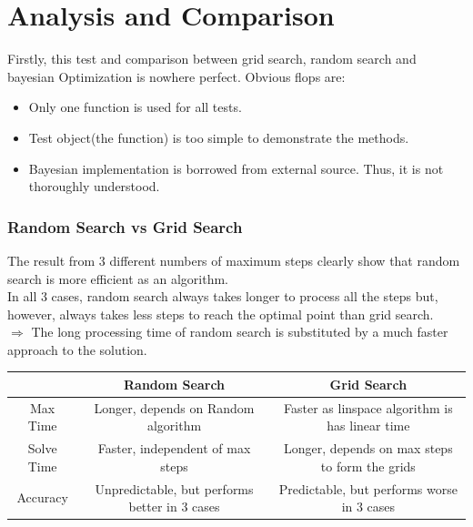 \documentclass[12pt]{article}
\begin{document}
  \part*{Analysis and Comparison}
    Firstly, this test and comparison between grid search, random search and bayesian Optimization is nowhere perfect.
    Obvious flops are:
      \begin{itemize}
        \item Only one function is used for all tests.
        \item Test object(the function) is too simple to demonstrate the methods.
        \item Bayesian implementation is borrowed from external source. Thus, it is not thoroughly understood.
      \end{itemize}
    \section*{Random Search vs Grid Search}
    The result from 3 different numbers of maximum steps clearly show that random search is more efficient as an algorithm.\\
    In all 3 cases, random search always takes longer to process all the steps but, however, always takes less steps to reach the optimal point than grid search. \\
    \(\Rightarrow\) The long processing time of random search is substituted by a much faster approach to the solution.

      \begin{center}
        \begin{tabular}{||c||c|c||} 
        \hline \hline
        & Random Search & Grid Search \\
        \hline
        Max Time & Longer, depends on Random algorithm & Faster as linspace algorithm is has linear time \\ 
        Solve Time & Faster, independent of max steps & Longer, depends on max steps to form the grids \\ 
        Accuracy & Unpredictable, but performs better in 3 cases & Predictable, but performs worse in 3 cases\\
        \hline \hline
        \end{tabular}
      \end{center}
\end{document}
